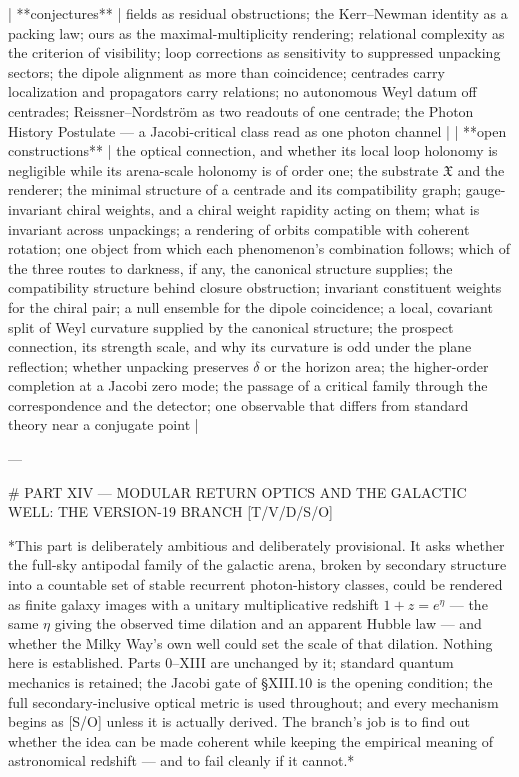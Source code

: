 | **conjectures** | fields as residual obstructions; the Kerr–Newman identity as a packing law; ours as the maximal-multiplicity rendering; relational complexity as the criterion of visibility; loop corrections as sensitivity to suppressed unpacking sectors; the dipole alignment as more than coincidence; centrades carry localization and propagators carry relations; no autonomous Weyl datum off centrades; Reissner–Nordström as two readouts of one centrade; the Photon History Postulate — a Jacobi-critical class read as one photon channel |
| **open constructions** | the optical connection, and whether its local loop holonomy is negligible while its arena-scale holonomy is of order one; the substrate $\mathfrak X$ and the renderer; the minimal structure of a centrade and its compatibility graph; gauge-invariant chiral weights, and a chiral weight rapidity acting on them; what is invariant across unpackings; a rendering of orbits compatible with coherent rotation; one object from which each phenomenon's combination follows; which of the three routes to darkness, if any, the canonical structure supplies; the compatibility structure behind closure obstruction; invariant constituent weights for the chiral pair; a null ensemble for the dipole coincidence; a local, covariant split of Weyl curvature supplied by the canonical structure; the prospect connection, its strength scale, and why its curvature is odd under the plane reflection; whether unpacking preserves $\delta$ or the horizon area; the higher-order completion at a Jacobi zero mode; the passage of a critical family through the correspondence and the detector; one observable that differs from standard theory near a conjugate point |

---

# PART XIV — MODULAR RETURN OPTICS AND THE GALACTIC WELL: THE VERSION-19 BRANCH [T/V/D/S/O]

*This part is deliberately ambitious and deliberately provisional. It asks whether the full-sky antipodal family of the galactic arena, broken by secondary structure into a countable set of stable recurrent photon-history classes, could be rendered as finite galaxy images with a unitary multiplicative redshift $1+z = e^\eta$ — the same $\eta$ giving the observed time dilation and an apparent Hubble law — and whether the Milky Way's own well could set the scale of that dilation. Nothing here is established. Parts 0–XIII are unchanged by it; standard quantum mechanics is retained; the Jacobi gate of §XIII.10 is the opening condition; the full secondary-inclusive optical metric is used throughout; and every mechanism begins as [S/O] unless it is actually derived. The branch's job is to find out whether the idea can be made coherent while keeping the empirical meaning of astronomical redshift — and to fail cleanly if it cannot.*

